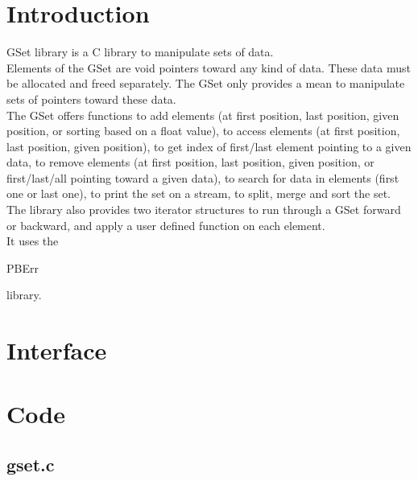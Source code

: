 \section*{Introduction}

GSet library is a C library to manipulate sets of data.\\

Elements of the GSet are void pointers toward any kind of data. These data must be allocated and freed separately. The GSet only provides a mean to manipulate sets of pointers toward these data.\\

The GSet offers functions to add elements (at first position, last position, given position, or sorting based on a float value), to access elements (at first position, last position, given position), to get index of first/last element pointing to a given data, to remove elements (at first position, last position, given position, or first/last/all pointing toward a given data), to search for data in elements (first one or last one), to print the set on a stream, to split, merge and sort the set.\\

The library also provides two iterator structures to run through a GSet forward or backward, and apply a user defined function on each element.\\ 

It uses the \begin{ttfamily}PBErr\end{ttfamily} library.\\

\section{Interface}

\begin{scriptsize}
\begin{ttfamily}

\end{ttfamily}
\end{scriptsize}

\section{Code}

\subsection{gset.c}

